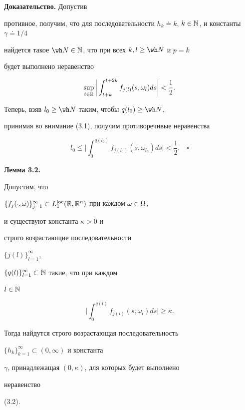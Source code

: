 {\bf Доказательство.} Допустив


противное, получим, что для последовательности $h_k\doteq


k$, $k\in \Bbb N$, и константы $\gamma \doteq 1/4$


найдется такое $\wh N\in \Bbb N$, что при всех $k,l\ge \wh N$ и $p=k$


будет выполнено неравенство


$$


\sup\limits_{t\in


\Bbb R}\bigg|\int_{t+k}^{t+2k}f_{j(l)}(s,\omega_l)ds\bigg|<\frac{1}{2}.


$$


Теперь, взяв $l_{0}\ge\wh N$ таким, чтобы $q(l_{0})\ge\wh N$,


принимая во внимание (3.1), получим противоречивые неравенства


$$


l_{0}\le \bigg|\int_{0}^{q(l_{0})}f_{j(l_0)}(s,\omega_{l_0})ds\bigg|<


\frac{1}{2}.\quad\square


$$





{\bf Лемма 3.2.} {\it


Допустим, что 


$\{f_j(\cdot,\omega)\}_{j=1}^{\infty}\subset


L_1^{\loc}(\Bbb R,\Bbb R^n)$ при каждом $\mm$,


и существуют константа $\kappa>0$ и


строго возрастающие последовательности


$\{j(l)\}_{l=1}^{\infty}$,


$\{q(l)\}_{l=1}^{\infty}\subset\Bbb N$ такие, что при каждом


$l\in \Bbb N$


\begin{equation}


\bigg|\int_0^{q(l)}f_{j(l)}(s,\omega_l)ds\bigg|\ge \kappa. \tag{3.3}


\end{equation}


Тогда найдутся строго возрастающая последовательность


$\{h_k\}_{k=1}^{\infty}\subset (0,\infty)$ и константа


$\gamma$, принадлежащая $(0,\kappa)$, для которых будет выполнено


неравенство} (3.2).


